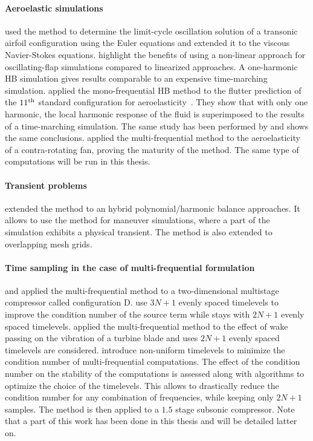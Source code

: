\paragraph{Aeroelastic simulations}
\citet{Thomas2002a} used the method to
determine the limit-cycle oscillation solution
of a transonic airfoil configuration using the
Euler equations and \citet{Thomas2004b} extended
it to the viscous Navier-Stokes equations.
\citet{JDufour2009} highlight the benefits of using a 
non-linear approach for oscillating-flap simulations
compared to linearized approaches. A one-harmonic HB simulation
gives results comparable to an expensive time-marching simulation.
\citet{Huang2013} applied the mono-frequential
HB method to the flutter prediction of the 
$11\textsuperscript{th}$ 
standard configuration for aeroelasticity~\cite{Fransson1999}.
They show that with only one harmonic, the local
harmonic response of the fluid is superimposed
to the results of a time-marching simulation.
The same study has been performed by 
\citet{Jsicot12:_time_domain_harmon_balan_method}
and shows the same conclusions.
\citet{JSicot2013} applied the multi-frequential 
method to the
aeroelasticity of a contra-rotating fan, proving
the maturity of the method. The same type of 
computations will be run in this thesis.


\paragraph{Transient problems}
\citet{Mavriplis2012} extended the method to 
an hybrid polynomial/harmonic balance approaches. 
It allows to use the method for maneuver simulations, 
where a part of the simulation exhibits a physical transient.
The method is also extended to overlapping mesh grids.

\paragraph{Time sampling in the case of multi-frequential formulation}
\citet{Gopinath2007} and \citet{Ekici2007}
applied the multi-frequential method to
a two-dimensional multistage compressor called
configuration D. \citet{Ekici2007} use
$3N+1$ evenly spaced 
timelevels to improve the condition number
of the source term while \citet{Gopinath2007}
stays with $2N+1$ evenly spaced timelevels.
\citet{Ekici2008a} applied the multi-frequential method
to the effect of wake passing on the vibration of
a turbine blade and uses $2N+1$ evenly spaced
timelevels are considered.
\citet{JGuedeney2013} introduce non-uniform 
timelevels to minimize the condition number of multi-frequential
computations. 
The effect of the condition number on the stability
of the computations is assessed along with algorithms
to optimize the choice of the timelevels.
This allows to drastically reduce the condition number for
any combination of frequencies, 
while keeping only $2N+1$ samples.
The method is then applied
to a $1.5$ stage subsonic compressor.
Note that a part of this work has been done in this
thesis and will be detailed latter on.

